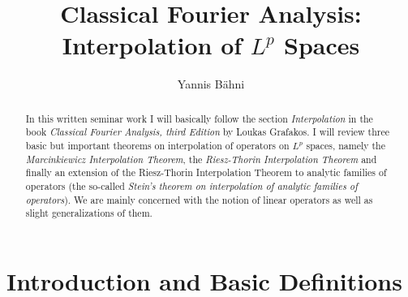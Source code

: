 

\begin{abstract}
	In this written seminar work I will basically follow the section \emph{Interpolation} in the book \emph{Classical Fourier Analysis, third Edition} by Loukas Grafakos. I will review three basic but important theorems on interpolation of operators on $L^p$ spaces, namely the \emph{Marcinkiewicz Interpolation Theorem}, the \emph{Riesz-Thorin Interpolation Theorem} and finally an extension of the Riesz-Thorin Interpolation Theorem to analytic families of operators (the so-called \emph{Stein's theorem on interpolation of analytic families of operators}). We are mainly concerned with the notion of linear operators as well as slight generalizations of them. 
\end{abstract}

\title{Classical Fourier Analysis: Interpolation of $L^p$ Spaces}
\author{Yannis B\"{a}hni}
\address[Yannis B\"{a}hni]{University of Zurich, R\"{a}mistrasse 71, 8006 Zurich}
\maketitle

\tableofcontents
\newpage

\mainsectionstyle

\section{Introduction and Basic Definitions}
